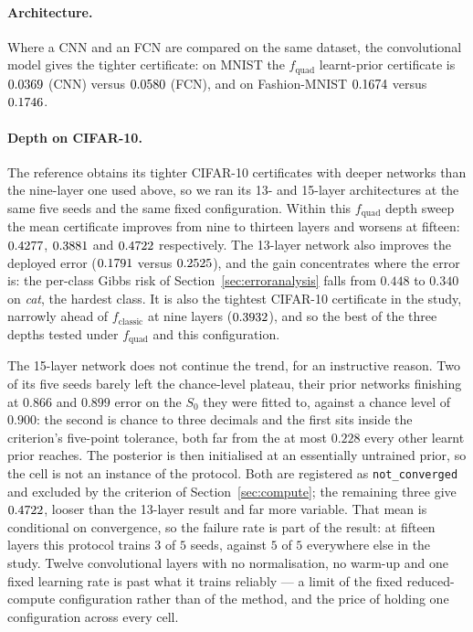 \paragraph{Architecture.} Where a CNN and an FCN are compared on the same dataset,
the convolutional model gives the tighter certificate: on MNIST the $f_{\text{quad}}$
learnt-prior certificate is $0.0369$ (CNN) versus
$0.0580$ (FCN), and on Fashion-MNIST
$0.1674$ versus $0.1746$.

\paragraph{Depth on CIFAR-10.} The reference obtains its tighter CIFAR-10
certificates with deeper networks than the nine-layer one used above, so we ran
its 13- and 15-layer architectures at the same five seeds and the same fixed
configuration. Within this $f_{\text{quad}}$ depth sweep the mean certificate
improves from nine to thirteen layers and worsens at fifteen:
$0.4277$, $0.3881$ and
$0.4722$ respectively. The 13-layer network also
improves the deployed error ($0.1791$ versus
$0.2525$), and the gain concentrates where the error
is: the per-class Gibbs risk of Section~\ref{sec:erroranalysis} falls from $0.448$
to $0.340$ on \emph{cat}, the hardest class. It is also the tightest CIFAR-10
certificate in the study, narrowly ahead of $f_{\text{classic}}$ at nine layers
($0.3932$), and so the best of the three depths tested
under $f_{\text{quad}}$ and this configuration.

The 15-layer network does not continue the trend, for an instructive reason. Two
of its five seeds barely left the chance-level plateau, their prior networks
finishing at $0.866$ and $0.899$ error on the $S_0$ they were fitted to, against
a chance level of $0.900$: the second is chance to three decimals and the first
sits inside the criterion's five-point tolerance, both far from the at most
$0.228$ every other learnt prior reaches. The posterior is then initialised at an
essentially untrained prior, so the cell is not an instance of the protocol. Both are
registered as \texttt{not\_converged} and excluded by the criterion of
Section~\ref{sec:compute}; the remaining three give
$0.4722$, looser than the 13-layer result and far
more variable. That mean is conditional on convergence, so the failure rate is
part of the result: at fifteen layers this protocol trains $3$ of $5$ seeds,
against $5$ of $5$ everywhere else in the study. Twelve convolutional layers with
no normalisation, no warm-up and one fixed learning rate is past what it trains
reliably --- a limit of the fixed reduced-compute configuration rather than of the
method, and the price of holding one configuration across every cell.

